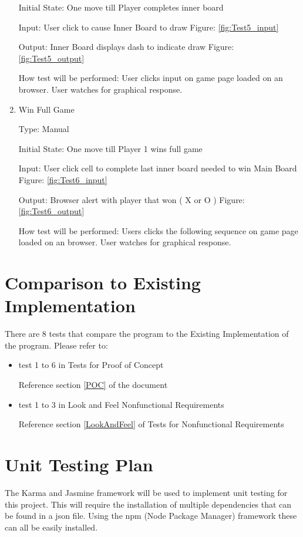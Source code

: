 \documentclass[12pt, titlepage]{article}
\begin{document}
\begin{enumerate}
Initial State: One move till Player completes inner board
					
Input: User click to cause Inner Board to draw Figure: \ref{fig:Test5_input}
					
Output:  Inner Board displays dash to indicate draw Figure: \ref{fig:Test5_output}
					
How test will be performed: User clicks input on game page loaded on an
browser. User watches for graphical response.

\item{Win Full Game\\}

Type: Manual
					
Initial State: One move till Player 1 wins full game
					
Input: User click cell to complete last inner board needed to win Main Board
Figure: \ref{fig:Test6_input}
					
Output:  Browser alert with player that won ( X or O ) Figure: \ref{fig:Test6_output}
					
How test will be performed: Users clicks the following sequence on game page
loaded on an browser. User watches for graphical response.

\end{enumerate}
	
\section{Comparison to Existing Implementation}
There are 8 tests that compare the program to the Existing Implementation of
the program. Please refer to:
\begin{itemize}

\item test 1 to 6 in Tests for Proof of Concept

Reference section \ref{POC} of the document
\item test 1 to 3 in Look and Feel Nonfunctional Requirements

Reference section \ref{LookAndFeel} of Tests for Nonfunctional Requirements

\end{itemize}		
				
\section{Unit Testing Plan}
The Karma and Jasmine framework will be used to implement unit testing for
this project. This will require the installation of multiple dependencies that
can be found in a json file. Using the npm (Node Package Manager) framework 
these can all be easily installed.
\end{document}
